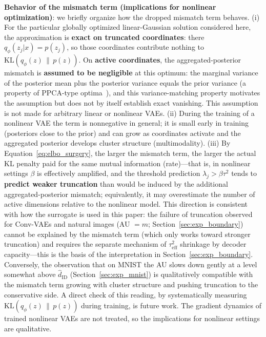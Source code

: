 \documentclass[make,article,submit,pdftex,moreauthors]{Definitions/mdpi}
\newcommand{\hatdID}{\hat{d}_{\mathrm{ID}}}
\begin{document}
\textbf{Behavior of the mismatch term (implications for nonlinear
optimization)}:
we briefly organize how the dropped mismatch term behaves.
(i) For the particular globally optimized linear-Gaussian solution
considered here, the approximation is \textbf{exact on truncated
coordinates}: there $q_\phi(z_j|x) = p(z_j)$, so those coordinates
contribute nothing to $\mathrm{KL}(q_\phi(z)\,\|\,p(z))$.
On \textbf{active coordinates}, the aggregated-posterior mismatch is
\textbf{assumed to be negligible} at this optimum: the marginal variance of
the posterior mean plus the posterior variance equals the prior variance (a
property of PPCA-type
optima~\cite{tippingbishop1999ppca,lucas2019elbo}), and this
variance-matching property motivates the assumption but does not by itself
establish exact vanishing.
This assumption is not made for arbitrary linear or nonlinear VAEs.
(ii) During the training of a nonlinear VAE the term is nonnegative in
general; it is small early in training (posteriors close to the prior) and
can grow as coordinates activate and the aggregated posterior develops
cluster structure (multimodality).
(iii) By Equation~\eqref{eq:elbo_surgery}, the larger the mismatch term,
the larger the actual KL penalty paid for the same mutual information
(rate)---that is, in nonlinear settings $\beta$ is effectively amplified,
and the threshold prediction $\lambda_j > \beta\tau^2$ tends to
\textbf{predict weaker truncation} than would be induced by the additional
aggregated-posterior mismatch; equivalently, it may overestimate the number
of active dimensions relative to the nonlinear model.
This direction is consistent with how the surrogate is used in this paper:
the failure of truncation observed for Conv-VAEs and natural images
(AU $= m$; Section~\ref{sec:exp_boundary}) cannot be explained by the
mismatch term (which only works toward stronger truncation) and requires
the separate mechanism of $\tau^2_{\mathrm{eff}}$ shrinkage by decoder
capacity---this is the basis of the interpretation in
Section~\ref{sec:exp_boundary}.
Conversely, the observation that on MNIST the AU slows down gently at a
level somewhat above $\hatdID$ (Section~\ref{sec:exp_mnist}) is
qualitatively compatible with the mismatch term growing with cluster
structure and pushing truncation to the conservative side.
A direct check of this reading, by systematically measuring
$\mathrm{KL}(q_\phi(z)\,\|\,p(z))$ during training, is future work.
The gradient dynamics of trained nonlinear VAEs are not treated, so the
implications for nonlinear settings are qualitative.
\end{document}
